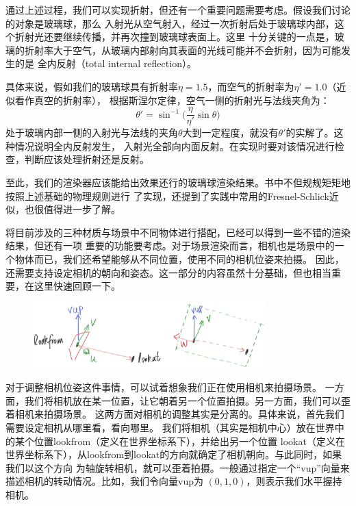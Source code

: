 \documentclass[12pt]{article}
\begin{document}
\indent{}通过上述过程，我们可以实现折射，但还有一个重要问题需要考虑。假设我们讨论的对象是玻璃球，那么
入射光从空气射入，经过一次折射后处于玻璃球内部，这个折射光还要继续传播，并再次撞到玻璃球表面上。这里
十分关键的一点是，玻璃的折射率大于空气，从玻璃内部射向其表面的光线可能并不会折射，因为可能发生的是
全内反射（total internal reflection）。

\indent{}具体来说，假如我们的玻璃球具有折射率$\eta=1.5$，而空气的折射率为$\eta'=1.0$（近似看作真空的折射率），
根据斯涅尔定律，空气一侧的折射光与法线夹角为：
\begin{equation}
\theta' = \sin^{-1}\bigg(\frac{\eta}{\eta'}\sin\theta\bigg)
\end{equation}
处于玻璃内部一侧的入射光与法线的夹角$\theta$大到一定程度，就没有$\theta'$的实解了。这种情况说明全内反射发生，
入射光全部向内面反射。在实现时要对该情况进行检查，判断应该处理折射还是反射。

\indent{}至此，我们的渲染器应该能给出效果还行的玻璃球渲染结果。书中不但规规矩矩地按照上述基础的物理规则进行
了实现，还提到了实践中常用的Fresnel-Schlick近似，也很值得进一步了解。

\indent{}将目前涉及的三种材质与场景中不同物体进行搭配，已经可以得到一些不错的渲染结果，但还有一项
重要的功能要考虑。对于场景渲染而言，相机也是场景中的一个物体而已，我们还希望能够从不同位置，使用不同的相机位姿来拍摄。
因此，还需要支持设定相机的朝向和姿态。这一部分的内容虽然十分基础，但也相当重要，在这里快速回顾一下。
\begin{figure}[h]
\centering
\includegraphics[width=0.8\textwidth]{./imgs/fig-1.16-cam-view-up.jpg}
\end{figure}

\indent{}对于调整相机位姿这件事情，可以试着想象我们正在使用相机来拍摄场景。
一方面，我们将相机放在某一位置，让它朝着另一个位置拍摄。另一方面，我们可以歪着相机来拍摄场景。
这两方面对相机的调整其实是分离的。具体来说，首先我们需要设定相机从哪里看，看向哪里。
我们将相机（其实是相机中心）放在世界中的某个位置lookfrom（定义在世界坐标系下），并给出另一个位置
lookat（定义在世界坐标系下），从lookfrom到lookat的方向就确定了相机朝向。与此同时，如果我们以这个方向
为轴旋转相机，就可以歪着拍摄。一般通过指定一个“vup”向量来描述相机的转动情况。比如，我们令向量vup为
$(0,1,0)$，则表示我们水平握持相机。
\end{document}
